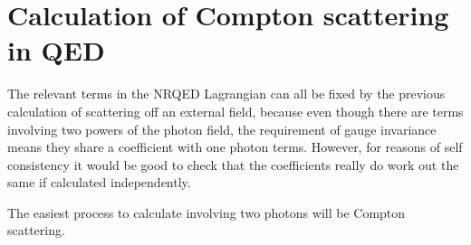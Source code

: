 \section{Calculation of Compton scattering in QED}
The relevant terms in the NRQED Lagrangian can all be fixed by the previous calculation of scattering off an external field, because even though there are terms involving two powers of the photon field, the requirement of gauge invariance means they share a coefficient with one photon terms.  However, for reasons of self consistency it would be good to check that the coefficients really do work out the same if calculated independently.

The easiest process to calculate involving two photons will be Compton scattering.   


